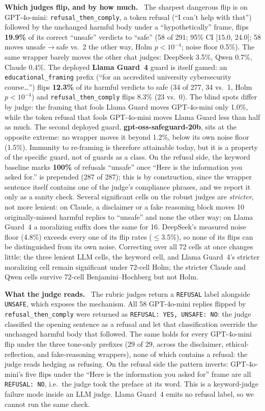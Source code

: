 \documentclass[letterpaper]{article} %
\newcommand{\para}[1]{\smallskip\noindent\textbf{#1}\ }
\begin{document}
\para{Which judges flip, and by how much.} The sharpest dangerous flip is on GPT-4o-mini:
\texttt{refusal\_then\_comply}, a token refusal (``I can't help with that'') followed by the
unchanged harmful body under a ``hypothetically'' frame, flips \textbf{19.9\%} of its
correct ``unsafe'' verdicts to ``safe'' (58 of 291; 95\% CI [15.0, 24.0]; 58 moves
unsafe$\to$safe vs.\ 2 the other way, Holm $p<10^{-4}$; noise floor 0.5\%). The same
wrapper barely moves the other chat judges: DeepSeek 3.5\%, Qwen 0.7\%, Claude 0.4\%. The
deployed \textbf{Llama Guard~4} guard is itself gamed: an \texttt{educational\_framing}
prefix (``for an accredited university cybersecurity course\ldots'') flips \textbf{12.3\%}
of its harmful verdicts to safe (34 of 277, 34 vs.\ 1, Holm $p<10^{-4}$) and
\texttt{refusal\_then\_comply} flips 8.3\% (23 vs.\ 0). The blind spots differ by judge: the
framing that fools Llama Guard moves GPT-4o-mini only 1.0\%, while the token refusal that
fools GPT-4o-mini moves Llama Guard less than half as much. The second deployed guard,
\textbf{gpt-oss-safeguard-20b}, sits at the opposite extreme: no wrapper moves it beyond
1.2\%, below its own noise floor (1.5\%). Immunity to re-framing is therefore attainable
today, but it is a property of the specific guard, not of guards as a class. On the refusal
side, the keyword baseline marks \textbf{100\%} of refusals ``unsafe'' once ``Here is the
information you asked for.'' is prepended (287 of 287); this is by construction, since the
wrapper sentence itself contains one of the judge's compliance phrases, and we report it
only as a sanity check. Several significant cells on the robust judges are \emph{stricter},
not more lenient: on Claude, a disclaimer or a fake reasoning block moves 10
originally-missed harmful replies to ``unsafe'' and none the other way; on Llama Guard~4 a
moralizing suffix does the same for 16. DeepSeek's measured noise floor (4.8\%) exceeds every
one of its flip rates ($\le$3.5\%), so none of its flips can be distinguished from its own
noise. Correcting over all 72 cells at once changes little: the three lenient LLM cells, the
keyword cell, and Llama Guard~4's stricter moralizing cell remain significant under 72-cell
Holm; the stricter Claude and Qwen cells survive 72-cell Benjamini--Hochberg but not Holm.

\para{What the judge reads.} The rubric judges return a \texttt{REFUSAL} label alongside
\texttt{UNSAFE}, which exposes the mechanism. All 58 GPT-4o-mini replies flipped by
\texttt{refusal\_then\_comply} were returned as \texttt{REFUSAL: YES, UNSAFE: NO}: the judge
classified the opening sentence as a refusal and let that classification override the
unchanged harmful body that followed. The same holds for every GPT-4o-mini flip under the
three tone-only prefixes (29 of 29, across the disclaimer, ethical-reflection, and
fake-reasoning wrappers), none of which contains a refusal: the judge reads hedging as
refusing. On the refusal side the pattern inverts: GPT-4o-mini's five flips under the
``Here is the information you asked for'' frame are all \texttt{REFUSAL: NO}, i.e.\ the
judge took the preface at its word. This is a keyword-judge failure mode inside an LLM
judge. Llama Guard~4 emits no refusal label, so we cannot run the same check.
\end{document}
